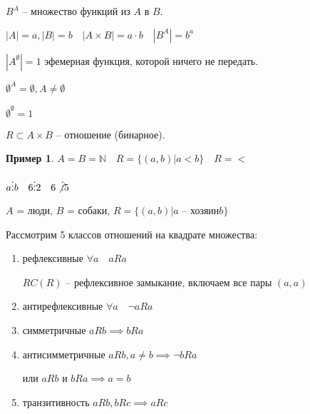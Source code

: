 \documentclass{book}
\newcommand\N{\ensuremath{\mathbb{N}}}
\renewcommand\O{\ensuremath{\emptyset}}
\theoremstyle{definition}
\newtheorem*{example}{Пример}
\begin{document}
        $B^A$ -- множество функций из $A$ в $B$.

        $|A| = a, |B| = b\quad |A\times B| = a\cdot b\quad |B^A| = b^a$

        $|A^{\O }| = 1$ эфемерная функция, которой ничего не передать.

        $\O ^A = \O , A \neq \O $

        $\O ^{\O } = 1$
       
        \begin{definition}
            $R\subset A\times B$ -- отношение (бинарное).

        \end{definition}
        \begin{example}
            $A=B=\N \quad R = \{(a,b)|a<b\}\quad R= <$

            $a\vdots b\quad 6\vdots 2\quad 6\not\vdots 5$

            $A$ = люди, $B$ = собаки, $R = \{(a,b)|a\text{ -- хозяин} b\}$
        \end{example}

        Рассмотрим 5 классов отношений на квадрате множества:
        \begin{enumerate}
            \item рефлексивные $\forall a \quad aRa$

                $RC(R)$ -- рефлексивное замыкание, включаем все пары $(a,a)$
            \item антирефлексивные $\forall a \quad \neg aRa$
            \item симметричные $aRb \implies bRa$
            \item антисимметричные $aRb, a\neq b \implies \neg bRa$

                или $aRb$ и $bRa \implies a=b$
            \item транзитивность $aRb, bRc \implies  aRc$
        \end{enumerate}
        
\end{document}
